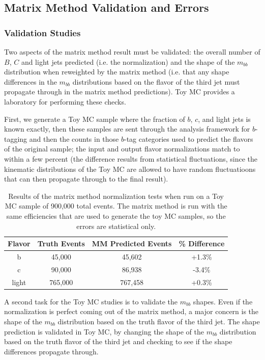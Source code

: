 \subsection{Matrix Method Validation and Errors}
\subsubsection{Validation Studies}
Two aspects of the matrix method result must be validated: the overall number of $B$, $C$ and light jets predicted (i.e. the normalization) and the shape of the $m_{bb}$ distribution when reweighted by the matrix method (i.e. that any shape differences in the $m_{bb}$ distributions based on the flavor of the third jet must propagate through in the matrix method predictions).  Toy MC provides a laboratory for performing these checks.  

First, we generate a Toy MC sample where the fraction of $b$, $c$, and light 
jets is known exactly, then these samples are sent through the analysis framework for $b$-tagging and 
then the counts in those $b$-tag categories used to predict the flavors of the original sample; 
the input and output flavor normalizations match to within a few percent (the difference results from statistical fluctuations, 
since the kinematic distributions of the Toy MC are allowed to have random fluctuatioons that can then propagate through to the final result).  
\begin{table}
\centering
\caption{Results of the matrix method normalization tests when run on a Toy MC sample of 
    900,000 total events.  The matrix method is run with the same efficiencies that
    are used to generate the toy MC samples, so the errors are statistical only.
    \label{tab:mm_toy_mc}   }
  \begin{tabular}{cccc}
     \hline \hline
     Flavor & Truth Events & MM Predicted Events & \% Difference  \\ \hline
     b   & 45,000 & 45,602 & +1.3\% \\
     c   & 90,000 & 86,938 & -3.4\% \\
     light & 765,000 & 767,458 & +0.3\% \\
     \hline     \end{tabular}
\end{table}

A second task for the Toy MC studies is to validate the $m_{bb}$ shapes.  Even if the normalization is perfect coming out of the matrix method, a major concern is the shape of the $m_{bb}$ distribution based on the truth flavor of the third jet.  The shape prediction is validated in Toy MC, by changing the shape of the $m_{bb}$ distribution based on the truth flavor of the third jet and checking to see if the shape differences propagate through.  



